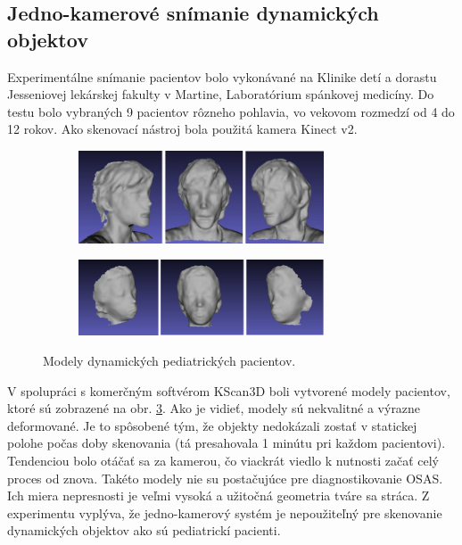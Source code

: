 \subsection{Jedno-kamerové snímanie dynamických objektov}

Experimentálne snímanie pacientov bolo vykonávané na Klinike detí a dorastu Jesseniovej lekárskej fakulty v Martine, Laboratórium spánkovej medicíny. Do testu bolo vybraných 9 pacientov rôzneho pohlavia, vo vekovom rozmedzí od 4 do 12 rokov. Ako skenovací nástroj bola použitá kamera Kinect v2.

\begin{figure}[h]
	\centering
	\begin{subfigure}[b]{\textwidth}
		\centering
		\includegraphics[width=0.8\textwidth]{figures/dynamic_patient_a.png}
		\label{fig:dynamic_patient:a}
	\end{subfigure}
	\vskip 8pt 
	\begin{subfigure}[b]{\textwidth}
		\centering
		\includegraphics[width=0.8\textwidth]{figures/dynamic_patient_b.png}
		\label{fig:dynamic_patient:b}
	\end{subfigure}
	\caption{Modely dynamických pediatrických pacientov.}
	\label{fig:dynamic_patient}
\end{figure}

V spolupráci s komerčným softvérom KScan3D boli vytvorené modely pacientov, ktoré sú zobrazené na obr. \ref{fig:dynamic_patient}. Ako je vidieť, modely sú nekvalitné a výrazne deformované. Je to spôsobené tým, že objekty nedokázali zostať v statickej polohe počas doby skenovania (tá presahovala 1 minútu pri každom pacientovi). Tendenciou bolo otáčať sa za kamerou, čo viackrát viedlo k nutnosti začať celý proces od znova. Takéto modely nie su postačujúce pre diagnostikovanie OSAS. Ich miera nepresnosti je veľmi vysoká a užitočná geometria tváre sa stráca. Z experimentu vyplýva, že jedno-kamerový systém je nepoužiteľný pre skenovanie dynamických objektov ako sú pediatrickí pacienti.  

